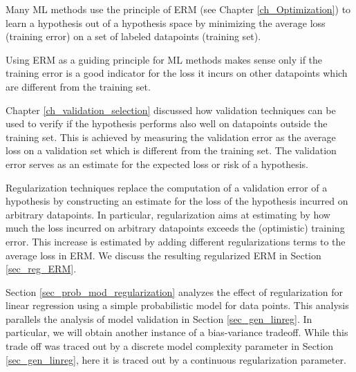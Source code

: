 \documentclass[12pt]{report}
\begin{document}

Many ML methods use the principle of ERM (see Chapter \ref{ch_Optimization}) 
to learn a hypothesis out of a hypothesis space by minimizing the average loss 
(training error) on a set of labeled datapoints (training set). 

Using ERM as a guiding principle for ML methods makes sense only if the 
training error is a good indicator for the loss it incurs on other datapoints 
which are different from the training set. %

Chapter \ref{ch_validation_selection} discussed how validation techniques 
can be used to verify if the hypothesis performs also well on datapoints 
outside the training set. This is achieved by measuring the validation error 
as the average loss on a validation set which is different from the training set. 
The validation error serves as an estimate for the expected loss or risk of a 
hypothesis. 

Regularization techniques replace the computation of a validation error of a 
hypothesis by constructing an estimate for the loss of the hypothesis incurred 
on arbitrary datapoints. In particular, regularization aims at estimating by how 
much the loss incurred on arbitrary datapoints exceeds the (optimistic) 
training error. This increase is estimated by adding different regularizations 
terms to the average loss in ERM. We discuss the resulting regularized ERM 
in Section \ref{sec_reg_ERM}. 

Section \ref{sec_prob_mod_regularization} analyzes the effect of regularization 
for linear regression using a simple probabilistic model for data points. This 
analysis parallels the analysis of model validation in Section \ref{sec_gen_linreg}. 
In particular, we will obtain another instance of a bias-variance tradeoff. While 
this trade off was traced out by a discrete model complexity parameter 
in Section \ref{sec_gen_linreg}, here it is traced out by a continuous 
regularization parameter. 
\end{document}
